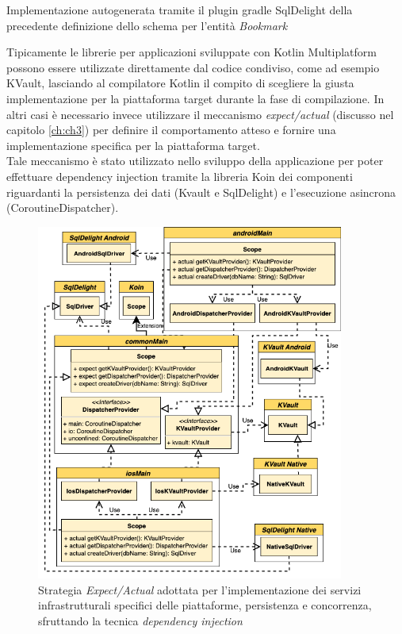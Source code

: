 \begin{listing}[H]
\inputminted{kotlin}{code/5-sqldelight1}
\caption{Implementazione autogenerata tramite il plugin gradle SqlDelight della precedente definizione dello schema per l'entità \textit{Bookmark}}
\end{listing}

Tipicamente le librerie per applicazioni sviluppate con Kotlin Multiplatform possono essere utilizzate direttamente dal codice condiviso, come ad esempio KVault, lasciando al compilatore Kotlin il compito di scegliere la giusta implementazione per la piattaforma target durante la fase di compilazione. In altri casi è necessario invece utilizzare il meccanismo \textit{expect/actual} (discusso nel capitolo \ref{ch:ch3}) per definire il comportamento atteso e fornire una implementazione specifica per la piattaforma target.\\
Tale meccanismo è stato utilizzato nello sviluppo della applicazione per poter effettuare dependency injection tramite la libreria Koin dei componenti riguardanti la persistenza dei dati (Kvault e SqlDelight) e l'esecuzione asincrona (CoroutineDispatcher).

\begin{figure}[H]
\centering
\includegraphics[width=0.9\textwidth]{img/tesi-21-expectactual.drawio.png}
\caption{Strategia \textit{Expect/Actual} adottata per l'implementazione dei servizi infrastrutturali specifici delle piattaforme, persistenza e concorrenza, sfruttando la tecnica \textit{dependency injection}}
\end{figure}

